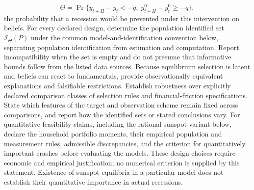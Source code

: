 \documentclass[11pt,a4paper]{article}
\begin{document}
\[
\Theta=\Pr\{y_{t+H}-y_t<-q,\;
y^{0}_{t+H}-y^{0}_t\ge -q\},
\]
the probability that a recession would be prevented under this intervention on beliefs. For every declared design, determine the population identified set \(\mathcal I_\Theta(P)\) under the common model-and-identification convention below, separating population identification from estimation and computation. Report incompatibility when the set is empty and do not presume that informative bounds follow from the listed data sources. Because equilibrium selection is latent and beliefs can react to fundamentals, provide observationally equivalent explanations and falsifiable restrictions. Establish robustness over explicitly declared comparison classes of selection rules and financial-friction specifications. State which features of the target and observation scheme remain fixed across comparisons, and report how the identified sets or stated conclusions vary. For quantitative feasibility claims, including the rational-sunspot variant below, declare the household portfolio moments, their empirical population and measurement rules, admissible discrepancies, and the criterion for quantitatively important crashes before evaluating the models. These design choices require economic and empirical justification; no numerical criterion is supplied by this statement. Existence of sunspot equilibria in a particular model does not establish their quantitative importance in actual recessions.
\end{document}
